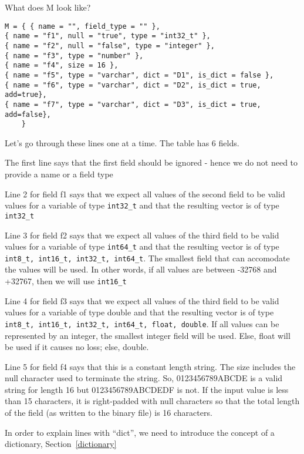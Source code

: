 \documentclass[letterpaper]{article}
\begin{document}
What does M look like?
\begin{verbatim}
M = { { name = "", field_type = "" },
{ name = "f1", null = "true", type = "int32_t" },
{ name = "f2", null = "false", type = "integer" },
{ name = "f3", type = "number" },
{ name = "f4", size = 16 },
{ name = "f5", type = "varchar", dict = "D1", is_dict = false }, 
{ name = "f6", type = "varchar", dict = "D2", is_dict = true, add=true},
{ name = "f7", type = "varchar", dict = "D3", is_dict = true, add=false},
    }
\end{verbatim}

Let's go through these lines one at a time. The table has 6 fields.

\be
\item 
The first line says that the first field should be ignored - hence we
do not need to provide a name or a field type
\item 
Line 2 for field f1 says that we expect all values of the second field to
be valid values for a variable of type \verb+int32_t+ and that the
resulting vector is of type \verb+int32_t+

\item 
Line 3 for field f2  says that we expect all values of the third field to
be valid values for a variable of type \verb+int64_t+ and that the
resulting vector is of type
\verb+int8_t, int16_t, int32_t, int64_t+. The smallest field that
can accomodate the values will be used. In other words, if all values are
between -32768 and +32767, then we will use \verb+int16_t+
\item 
Line 4 for field f3 says that we expect all values of the third field to
be valid values for a variable of type double and that the resulting
vector is of type
\verb+int8_t, int16_t, int32_t, int64_t, float, double+. If all values
can be represented by an integer, the smallest integer field will be
used. Else, float will be used if it causes no loss; else, double.
\item Line 5 for field f4 says that this is a constant length string. The size
  includes the null character used to terminate the string. So, 0123456789ABCDE
  is a valid string for length 16 but 0123456789ABCDEDF is not. If the input
  value is less than 15 characters, it is right-padded with null characters so that
  the total length of the field (as written to the binary file) is 16
  characters. 

\item 
In order to explain lines with ``dict'', we need to introduce the concept of
a dictionary, Section~\ref{dictionary}
\ee
\end{document}
